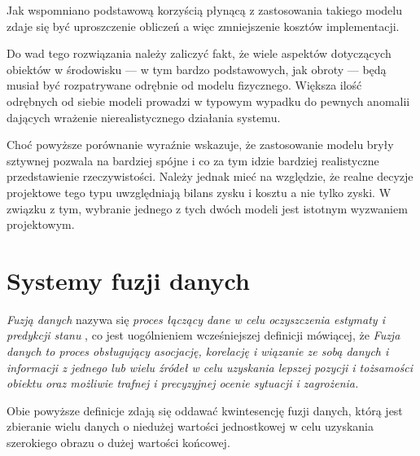 \par{
Jak wspomniano podstawową korzyścią płynącą z zastosowania takiego modelu zdaje się być uproszczenie obliczeń a więc zmniejszenie kosztów implementacji.
}
\par{
Do wad tego rozwiązania należy zaliczyć fakt, że wiele aspektów dotyczących obiektów w środowisku --- w tym bardzo podstawowych, jak obroty --- będą musiał być rozpatrywane odrębnie od modelu fizycznego. Większa ilość odrębnych od siebie modeli prowadzi w typowym wypadku do pewnych anomalii dających wrażenie nierealistycznego działania systemu.
}
\par{
Choć powyższe porównanie wyraźnie wskazuje, że zastosowanie modelu bryły sztywnej pozwala na bardziej spójne i co za tym idzie bardziej realistyczne przedstawienie rzeczywistości. Należy jednak mieć na względzie, że realne decyzje projektowe tego typu uwzględniają bilans zysku i kosztu a nie tylko zyski. W związku z tym, wybranie jednego z tych dwóch modeli jest istotnym wyzwaniem projektowym.
}

\section[Systemy fuzji danych][Systemy fuzji danych]{Systemy fuzji danych}
\par{
\textit{Fuzją danych} nazywa się \textit{proces łączący dane w celu oczyszczenia estymaty i predykcji stanu} \cite{revisionsJDL}, co jest uogólnieniem wcześniejszej definicji \cite{jdl} mówiącej, że \textit{Fuzja danych to proces obsługujący asocjację, korelację i wiązanie ze sobą danych i informacji z jednego lub wielu źródeł w celu uzyskania lepszej pozycji i tożsamości obiektu oraz możliwie trafnej i precyzyjnej ocenie sytuacji i zagrożenia.}
}
\par{
Obie powyższe definicje zdają się oddawać kwintesencję fuzji danych, którą jest zbieranie wielu danych o niedużej wartości jednostkowej w celu uzyskania szerokiego obrazu o dużej wartości końcowej.
}

